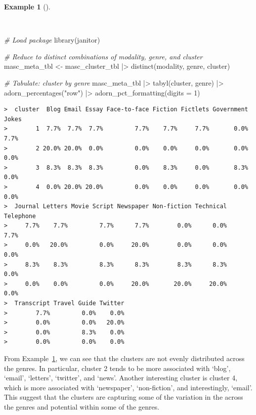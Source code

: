 \documentclass[
  letterpaper,
  DIV=11,
  numbers=noendperiod]{scrreprt}
\newenvironment{Shaded}{\begin{snugshade}}{\end{snugshade}}
\newcommand{\AttributeTok}[1]{\textcolor[rgb]{0.00,0.00,0.00}{#1}}
\newcommand{\CommentTok}[1]{\textcolor[rgb]{0.00,0.00,0.00}{\textit{#1}}}
\newcommand{\DecValTok}[1]{\textcolor[rgb]{0.00,0.00,0.00}{#1}}
\newcommand{\FunctionTok}[1]{\textcolor[rgb]{0.00,0.00,0.00}{#1}}
\newcommand{\NormalTok}[1]{\textcolor[rgb]{0.00,0.00,0.00}{#1}}
\newcommand{\OtherTok}[1]{\textcolor[rgb]{0.00,0.00,0.00}{#1}}
\newcommand{\SpecialCharTok}[1]{\textcolor[rgb]{0.00,0.00,0.00}{#1}}
\newcommand{\StringTok}[1]{\textcolor[rgb]{0.00,0.00,0.00}{#1}}
\theoremstyle{definition}
\newtheorem{example}{Example}[chapter]
\theoremstyle{remark}
\begin{document}
\begin{example}[]\protect\hypertarget{exm-eda-masc-pos-kmeans-modality}{}\label{exm-eda-masc-pos-kmeans-modality}

~

\begin{Shaded}
\begin{Highlighting}[]
\CommentTok{\# Load package}
\FunctionTok{library}\NormalTok{(janitor)}

\CommentTok{\# Reduce to distinct combinations of modality, genre, and cluster}
\NormalTok{masc\_meta\_tbl }\OtherTok{\textless{}{-}}
\NormalTok{  masc\_cluster\_tbl }\SpecialCharTok{|\textgreater{}}
  \FunctionTok{distinct}\NormalTok{(modality, genre, cluster)}

\CommentTok{\# Tabulate: cluster by genre}
\NormalTok{masc\_meta\_tbl }\SpecialCharTok{|\textgreater{}}
  \FunctionTok{tabyl}\NormalTok{(cluster, genre) }\SpecialCharTok{|\textgreater{}}
  \FunctionTok{adorn\_percentages}\NormalTok{(}\StringTok{"row"}\NormalTok{) }\SpecialCharTok{|\textgreater{}}
  \FunctionTok{adorn\_pct\_formatting}\NormalTok{(}\AttributeTok{digits =} \DecValTok{1}\NormalTok{)}
\end{Highlighting}
\end{Shaded}

\begin{verbatim}
>  cluster  Blog Email Essay Face-to-face Fiction Fictlets Government Jokes
>        1  7.7%  7.7%  7.7%         7.7%    7.7%     7.7%       0.0%  7.7%
>        2 20.0% 20.0%  0.0%         0.0%    0.0%     0.0%       0.0%  0.0%
>        3  8.3%  8.3%  8.3%         0.0%    8.3%     0.0%       8.3%  0.0%
>        4  0.0% 20.0% 20.0%         0.0%    0.0%     0.0%       0.0%  0.0%
>  Journal Letters Movie Script Newspaper Non-fiction Technical Telephone
>     7.7%    7.7%         7.7%      7.7%        0.0%      0.0%      7.7%
>     0.0%   20.0%         0.0%     20.0%        0.0%      0.0%      0.0%
>     8.3%    8.3%         8.3%      8.3%        8.3%      8.3%      0.0%
>     0.0%    0.0%         0.0%     20.0%       20.0%     20.0%      0.0%
>  Transcript Travel Guide Twitter
>        7.7%         0.0%    0.0%
>        0.0%         0.0%   20.0%
>        0.0%         8.3%    0.0%
>        0.0%         0.0%    0.0%
\end{verbatim}

\end{example}

From Example~\ref{exm-eda-masc-pos-kmeans-modality}, we can see that the
clusters are not evenly distributed across the genres. In particular,
cluster 2 tends to be more associated with `blog', `email', `letters',
`twitter', and `news'. Another interesting cluster is cluster 4, which
is more associated with `newspaper', `non-fiction', and interestingly,
`email'. This suggest that the clusters are capturing some of the
variation in the across the genres and potential within some of the
genres.
\end{document}
